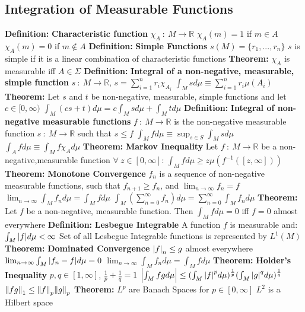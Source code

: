 \documentclass[14pt]{extarticle}
\def\Definition{{\color{blue} \textbf{Definition:} }}
\def\Theorem{{\color{red} \textbf{Theorem:} }}
\begin{document}
\begin{outline}
	\section*{Integration of Measurable Functions}
		\1	\Definition \textbf{Characteristic function}
			\2	$\chi_A~:~M \rightarrow \mathbb{R}$
			\2	$\chi_A(m) = 1$ if $m \in A$
			\2	$\chi_A(m) = 0$ if $m \notin A$
		\1	\Definition \textbf{Simple Functions}
			\2	$s(M) = \{r_1,...,r_n\}$
			\2	$s$ is simple if it is a linear combination of characteristic functions
		\1	\Theorem $\chi_A$ is measurable iff $A \in \Sigma$
		\1	\Definition \textbf{Integral of a non-negative, measurable, simple function}
			\2	$s~:~M \rightarrow \mathbb{R}$, $s = \sum_{i=1}^n r_i \chi_{A_i}$
			\2	$\int_M s d\mu \equiv \sum_{i=1}^n r_i \mu(A_i)$
		\1	\Theorem Let $s$ and $t$ be non-negative, measurable, simple functions
				and let $c \in [0,\infty)$
				\2	$\int_M(cs + t)d\mu = c \int_M s d\mu + \int_M t d\mu$
		\1	\Definition \textbf{Integral of non-negative measurable functions}
			\2	$f~:~M \rightarrow \mathbb{R}$ is the non-negative measurable function
			\2	$s~:~M \rightarrow \mathbb{R}$ such that $s \le f$
			\2	$\int_M f d\mu \equiv \sup_{s \in S}\int_M s d\mu$
				\3	$\int_A f d\mu \equiv \int_M f \chi_A d\mu$
		\1	\Theorem \textbf{Markov Inequality}
			\2	Let $f~:~M \rightarrow \mathbb{R}$ be a non-negative,measurable function
			\2	$\forall~z \in [0,\infty]$:
			\2	$\int_M f d\mu \ge z \mu(f^{-1}([z,\infty]))$
		\1	\Theorem \textbf{Monotone Convergence}
			\2	$f_n$ is a sequence of non-negative measurable functions, such that
					$f_{n+1} \ge f_n$, and $\lim_{n\rightarrow \infty}f_n = f$
			\2	$\lim_{n\rightarrow \infty} \int_M f_n d\mu = \int_M f d\mu$
			\2	$\int_M(\sum_{n=0}^{\infty}f_n)d\mu = \sum_{n=0}^{\infty}\int_M f_n d\mu$
		\1	\Theorem Let $f$ be a non-negative, measurable function.  Then
				$\int_M f d\mu = 0$ iff $f = 0$ almost everywhere
		\1	\Definition \textbf{Lesbegue Integrable}
			\2	A function $f$ is measurable and:
			\2	$\int_M \abs{f}d\mu < \infty$
			\2	Set of all Lesbegue Integrable functions is represented by $L^1(M)$
		\1	\Theorem \textbf{Dominated Convergence}
			\2	$\abs{f}_n \le g$ almost everywhere
			\2	$\lim_{n \rightarrow \infty}\int_M\abs{f_n - f}d\mu = 0$
			\2	$\lim_{n \rightarrow \infty}\int_Mf_nd\mu = \int_M f d\mu$
		\1	\Theorem \textbf{Holder's Inequality}
			\2	$p,q \in [1,\infty]$, $\frac{1}{p} + \frac{1}{q} = 1$
			\2	$\abs{\int_M fg d\mu} \le (\int_M\abs{f}^pd\mu)^{\frac{1}{p}}
					(\int_M \abs{g}^qd\mu)^{\frac{1}{q}}$
			\2	$\norm{fg}_1 \le \norm{f}_p \norm{g}_p$
		\1	\Theorem $L^p$ are Banach Spaces for $p \in [0,\infty]$
			\2	$L^2$ is a Hilbert space
	

\end{outline}
\end{document}
